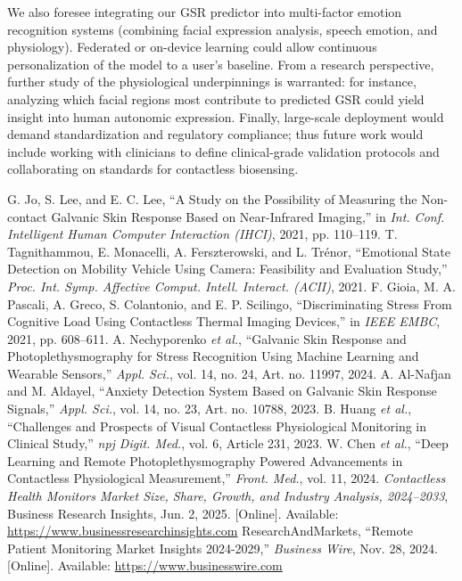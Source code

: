     We also foresee integrating our GSR predictor into multi-factor emotion recognition systems (combining facial expression analysis, speech emotion, and physiology). Federated or on-device learning could allow continuous personalization of the model to a user’s baseline. From a research perspective, further study of the physiological underpinnings is warranted: for instance, analyzing which facial regions most contribute to predicted GSR could yield insight into human autonomic expression. Finally, large-scale deployment would demand standardization and regulatory compliance; thus future work would include working with clinicians to define clinical-grade validation protocols and collaborating on standards for contactless biosensing.

    \begin{thebibliography}{99}
         G. Jo, S. Lee, and E. C. Lee, ``A Study on the Possibility of Measuring the Non-contact Galvanic Skin Response Based on Near-Infrared Imaging,'' in \emph{Int. Conf. Intelligent Human Computer Interaction (IHCI)}, 2021, pp. 110--119.
         T. Tagnithammou, E. Monacelli, A. Ferszterowski, and L. Trénor, ``Emotional State Detection on Mobility Vehicle Using Camera: Feasibility and Evaluation Study,'' \emph{Proc. Int. Symp. Affective Comput. Intell. Interact. (ACII)}, 2021.
         F. Gioia, M. A. Pascali, A. Greco, S. Colantonio, and E. P. Scilingo, ``Discriminating Stress From Cognitive Load Using Contactless Thermal Imaging Devices,'' in \emph{IEEE EMBC}, 2021, pp. 608--611.
         A. Nechyporenko \emph{et al.}, ``Galvanic Skin Response and Photoplethysmography for Stress Recognition Using Machine Learning and Wearable Sensors,'' \emph{Appl. Sci.}, vol. 14, no. 24, Art. no. 11997, 2024.
         A. Al-Nafjan and M. Aldayel, ``Anxiety Detection System Based on Galvanic Skin Response Signals,'' \emph{Appl. Sci.}, vol. 14, no. 23, Art. no. 10788, 2023.
         B. Huang \emph{et al.}, ``Challenges and Prospects of Visual Contactless Physiological Monitoring in Clinical Study,'' \emph{npj Digit. Med.}, vol. 6, Article 231, 2023.
         W. Chen \emph{et al.}, ``Deep Learning and Remote Photoplethysmography Powered Advancements in Contactless Physiological Measurement,'' \emph{Front. Med.}, vol. 11, 2024.
         \emph{Contactless Health Monitors Market Size, Share, Growth, and Industry Analysis, 2024--2033}, Business Research Insights, Jun. 2, 2025. [Online]. Available: \url{https://www.businessresearchinsights.com}
         ResearchAndMarkets, ``Remote Patient Monitoring Market Insights 2024-2029,'' \emph{Business Wire}, Nov. 28, 2024. [Online]. Available: \url{https://www.businesswire.com}
    \end{thebibliography}

